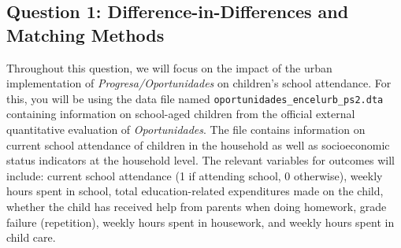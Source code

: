 \documentclass[12pt]{article} %
\begin{document}
\subsection*{Question 1: Difference-in-Differences and Matching Methods}
Throughout this question, we will focus on the impact of the urban implementation of \textit{Progresa/Oportunidades} on children's school attendance. For this, you will be using the data file named \texttt{oportunidades\_encelurb\_ps2.dta} containing information on school-aged children from the official external quantitative evaluation of \textit{Oportunidades}. The file contains information on current school attendance of children in the household as well as socioeconomic status indicators at the household level. The relevant variables for outcomes will include: current school attendance (1 if attending school, 0 otherwise), weekly hours spent in school, total education-related expenditures made on the child, whether the child has received help from parents when doing homework, grade failure (repetition), weekly hours spent in housework, and weekly hours spent in child care.
\end{document}
